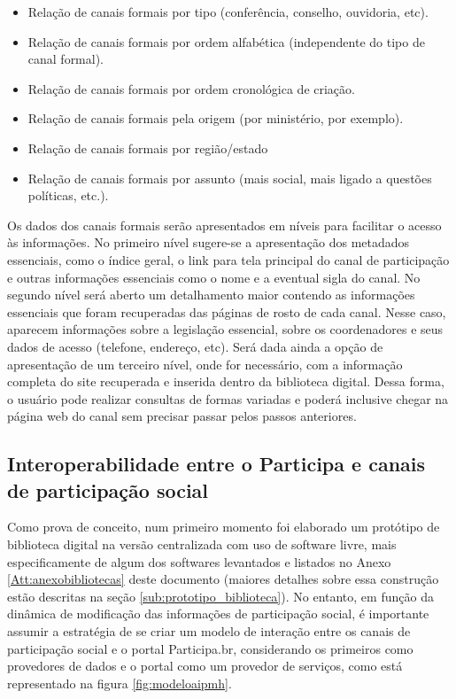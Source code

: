 \begin{itemize}
	\item Relação de canais formais por tipo (conferência, conselho, ouvidoria, etc). 
	\item Relação de canais formais por ordem alfabética (independente do tipo de canal formal).
	\item Relação de canais formais por ordem cronológica de criação.
	\item Relação de canais formais pela origem (por ministério, por exemplo).
	\item Relação de canais formais por região/estado
	\item Relação de canais formais por assunto (mais social, mais ligado a questões políticas, etc.).
\end{itemize}

Os dados dos canais formais serão apresentados em níveis para facilitar o acesso às informações. No primeiro nível sugere-se a apresentação dos metadados essenciais, como o índice geral, o link para tela principal do canal de participação e outras informações essenciais como o nome e a eventual sigla do canal. No segundo nível será aberto um detalhamento maior contendo as informações essenciais que foram recuperadas das páginas de rosto de cada canal. Nesse caso, aparecem informações sobre a legislação essencial, sobre os coordenadores e seus dados de acesso (telefone, endereço, etc). Será dada ainda a opção de apresentação de um terceiro nível, onde for necessário, com a informação completa do site recuperada e inserida dentro da biblioteca digital. Dessa forma, o usuário pode realizar consultas de formas variadas e poderá inclusive chegar na página web do canal sem precisar passar pelos passos anteriores.

\subsection{Interoperabilidade entre o Participa e canais de participação social}

Como prova de conceito, num primeiro momento foi elaborado um protótipo de biblioteca digital na versão centralizada com uso de software livre, mais especificamente de algum dos softwares levantados e listados no Anexo \ref{Att:anexobibliotecas} deste documento (maiores detalhes sobre essa construção estão descritas na seção \ref{sub:prototipo_biblioteca}). No entanto, em função da dinâmica de modificação das informações de participação social, é importante assumir a estratégia de se criar um modelo de interação entre os canais de participação social e o portal Participa.br, considerando os primeiros como provedores de dados e o portal como um provedor de serviços, como está representado na figura \ref{fig:modeloaipmh}.

